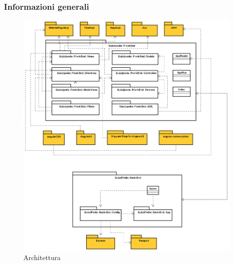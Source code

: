 \subsubsection{Informazioni generali}
\label{Architettura}
\begin{figure}[ht]
	\centering
	\includegraphics[scale=0.35]{UML/Package/QuizziPedia.png}
	\caption{Architettura}
\end{figure}
\FloatBarrier
